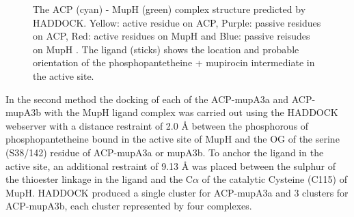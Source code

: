 			\setlength\fboxsep{5pt}
			\setlength\fboxrule{1.5pt}
			\begin{figure} [h!]
			\centering
			\caption[The ACP-MupH complex structure predicted by HADDOCK.]{The ACP (cyan) - MupH (green) complex structure predicted by HADDOCK. Yellow: active residue on ACP, Purple: passive residues on ACP, Red: active residues on MupH and Blue: passive reisudes on MupH . The ligand (sticks) shows the location and probable orientation of the phosphopantetheine + mupirocin intermediate in the active site.}
			\label{fig:activepassive}
			\end{figure}					

	In the second method the docking of each of the ACP-mupA3a and ACP-mupA3b with the MupH ligand complex was carried out using the HADDOCK webserver with a  distance restraint of 2.0 \AA{} between the phosphorous of phosphopantetheine bound in the active site of MupH and the OG of the serine (S38/142) residue of ACP-mupA3a or mupA3b. To anchor the ligand in the active site, an additional restraint of 9.13 \AA{} was placed between the sulphur of the thioester linkage in the ligand and the C$ \alpha $ of the catalytic Cysteine (C115) of MupH. HADDOCK produced a single cluster for ACP-mupA3a and 3 clusters for ACP-mupA3b, each cluster represented by four complexes.

